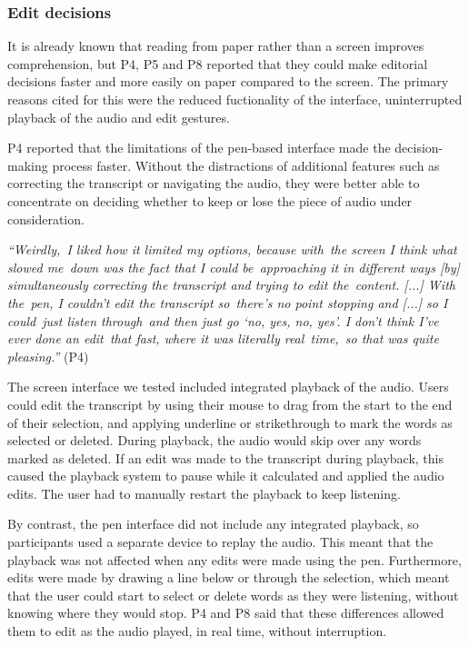 \subsubsection{Edit decisions}\label{sec:paper-edit-decisions}

It is already known that reading from paper rather than a screen improves comprehension, but P4, P5 and P8 reported
that they could make editorial decisions faster and more easily on paper compared to the screen. The primary
reasons cited for this were the reduced fuctionality of the interface, uninterrupted playback of the audio and edit
gestures.

P4 reported that the limitations of the pen-based interface made the decision-making process faster. Without the
distractions of additional features such as correcting the transcript or navigating the audio, they were better able to
concentrate on deciding whether to keep or lose the piece of audio under consideration.

\textit{``Weirdly, I liked how it limited my options, because with the screen I think what slowed me down
  was the fact that I could be approaching it in different ways [by]
  simultaneously correcting the transcript and trying to edit the content. [...]
  With the pen, I couldn't edit the transcript so there's no point stopping and [...]
  so I could just listen through and then just go `no, yes, no, yes'.
I don't think I've ever done an edit that fast, where it was literally real time, so that was quite pleasing.''} (P4)

The screen interface we tested included integrated playback of the audio. Users could edit the transcript by using
their mouse to drag from the start to the end of their selection, and applying underline or strikethrough to mark the
words as selected or deleted. During playback, the audio would skip over any words marked as deleted.  If an edit was
made to the transcript during playback, this caused the playback system to pause while it calculated and applied the
audio edits.  The user had to manually restart the playback to keep listening.

By contrast, the pen interface did not include any integrated playback, so participants used a separate device to
replay the audio. This meant that the playback was not affected when any edits were made using the pen. Furthermore,
edits were made by drawing a line below or through the selection, which meant that the user could start to select or
delete words as they were listening, without knowing where they would stop.  P4 and P8 said that these differences
allowed them to edit as the audio played, in real time, without interruption.

